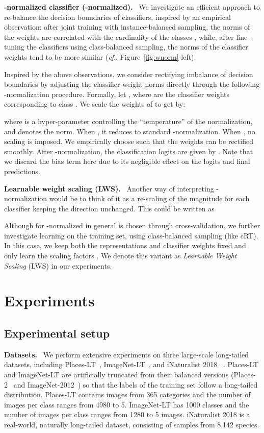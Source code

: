\documentclass[dvipsnames]{article} \usepackage{iclr2020_conference, times}
\makeatletter
\DeclareRobustCommand\onedot{\futurelet\@let@token\@onedot}
\def\@onedot{\ifx\@let@token.\else.\null\fi\xspace}
\def\cf{\emph{cf}\onedot} \def\Cf{\emph{Cf}\onedot}
\newcommand{\header}[1]{\noindent\textbf{#1.}~}
\newcommand{\uniform}{instance-balanced\xspace}
\newcommand{\balanced}{class-balanced\xspace}
\newcommand{\retrain}{cRT\xspace}
\newcommand{\wnorm}{-normalized\xspace}
\newcommand{\LWS}{LWS}
\makeatother
\begin{document}
\header{-normalized classifier (\wnorm)}
We investigate an efficient approach to re-balance the decision boundaries of classifiers, inspired by an empirical observation: after joint training with \uniform sampling, the norms of the weights  are correlated with the cardinality of the classes , while, after fine-tuning the classifiers using \balanced sampling, the norms of the classifier weights tend to be more similar (\cf Figure~\ref{fig:wnorm}-left). 


Inspired by the above observations, we consider   rectifying imbalance of decision boundaries by adjusting the classifier weight norms directly through the following -normalization procedure. Formally, let , where  are the classifier weights corresponding to class . We scale the weights of  to get  by:

where  is a hyper-parameter controlling the ``temperature'' of the normalization, and  denotes the  norm. When , it reduces to standard -normalization. When , no scaling is imposed. We empirically choose  such that the weights can be rectified smoothly. After -normalization, the classification logits are given by . Note that we discard the bias term  here due to its negligible effect on the logits and final predictions. 


\header{Learnable weight scaling (\LWS)}
Another way of interpreting -normalization would be to think of it as a re-scaling of the magnitude for each classifier  keeping the direction unchanged. This could be written as

Although for \wnorm in general  is chosen through cross-validation, we further investigate learning  on the training set, using \balanced sampling (like \retrain). In this case, we keep both the representations and classifier weights fixed and only learn the scaling factors . We denote this variant as \emph{Learnable Weight Scaling} (LWS) in our experiments. 

\section{Experiments}
\label{sec:experiments}


\subsection{Experimental setup}


\header{Datasets} We perform extensive experiments on three large-scale long-tailed datasets, including Places-LT~\citep{liu2019large}, ImageNet-LT~\citep{liu2019large}, and iNaturalist 2018 ~\citep{inat18}. Places-LT and ImageNet-LT are artificially truncated from their balanced versions (Places-2~\citep{zhou2017places} and ImageNet-2012~\citep{deng2009imagenet}) so that the labels of the training set follow a long-tailed distribution. Places-LT contains images from 365 categories and the number of images per class ranges from 4980 to 5. ImageNet-LT has 1000 classes and the number of images per class ranges from  1280 to 5 images. iNaturalist 2018 is a real-world, naturally long-tailed dataset, consisting of samples from 8,142 species. 
\end{document}
